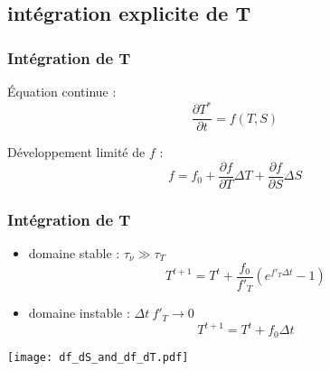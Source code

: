 \subsection{intégration explicite de T}

\begin{frame}
\frametitle{Intégration de T}

\'Equation continue :
$$ \frac{\partial T^*}{\partial t} = f(T,S)$$

Développement limité de $f$ :
$$ f = f_0 + \frac{\partial f}{\partial T} \Delta T + \frac{\partial f}{\partial S} \Delta S$$

\end{frame}

\begin{frame}
\frametitle{Intégration de T}
\begin{itemize}

\item domaine stable : $\tau_{\nu} \gg \tau_T$ 
$$T^{t+1} = T^t + \frac{f_0}{f'_T} \left( e^{f'_T \Delta t} - 1 \right) $$

\item domaine instable : $\Delta t\ f'_T \rightarrow 0$
$$T^{t+1} = T^t + f_0 \Delta t$$

\end{itemize}
\end{frame}

\begin{frame}
    \begin{center}
    \texttt{[image: df\_dS\_and\_df\_dT.pdf]}
    \end{center}
\end{frame}
